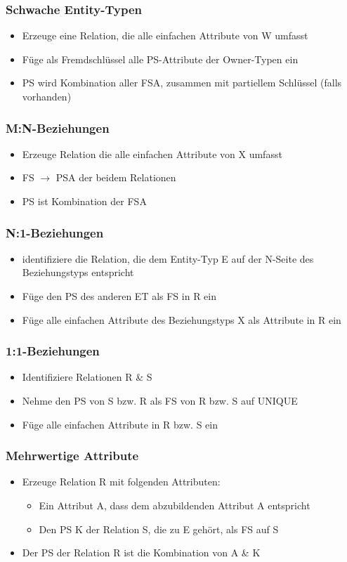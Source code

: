 \subsubsection{Schwache Entity-Typen}
\begin{itemize}
	\item Erzeuge eine Relation, die alle einfachen Attribute von W umfasst
	\item Füge als Fremdschlüssel alle PS-Attribute der Owner-Typen ein
	\item PS wird Kombination aller FSA, zusammen mit partiellem Schlüssel (falls vorhanden)
\end{itemize}
\subsubsection{M:N-Beziehungen}
\begin{itemize}
	\item Erzeuge Relation die alle einfachen Attribute von X umfasst
	\item FS $\to$ PSA der beidem Relationen
	\item PS ist Kombination der FSA
\end{itemize}
\subsubsection{N:1-Beziehungen}
\begin{itemize}
	\item identifiziere die Relation, die dem Entity-Typ E auf der N-Seite des Beziehungstyps entspricht
	\item Füge den PS des anderen ET als FS in R ein
	\item Füge alle einfachen Attribute des Beziehungstyps X als Attribute in R ein
\end{itemize}
\subsubsection{1:1-Beziehungen}
\begin{itemize}
	\item Identifiziere Relationen R \& S
	\item Nehme den PS von S bzw. R als FS von R bzw. S auf UNIQUE
	\item Füge alle einfachen Attribute in R bzw. S ein
\end{itemize}
\subsubsection{Mehrwertige Attribute}
\begin{itemize}
	\item Erzeuge Relation R mit folgenden Attributen:
		\begin{itemize}
			\item Ein Attribut A, dass dem abzubildenden Attribut A entspricht
			\item Den PS K der Relation S, die zu E gehört, als FS auf S
		\end{itemize}
	\item Der PS der Relation R ist die Kombination von A \& K
\end{itemize}
